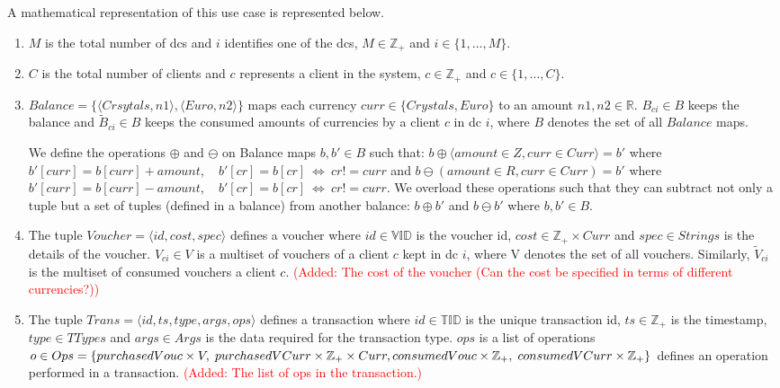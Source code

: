 A mathematical representation of this use case is represented below.
\begin{enumerate}
	\item $M$ is the total number of \glspl{dc} and $i$ identifies one of the \glspl{dc}, $M \in \mathbb{Z}_{+}$ and $i \in \{1,\dots, M\}$.

	\item $C$ is the total number of clients and $c$ represents a client in the system, $c \in \mathbb{Z}_{+}$ and $c \in \{1,\dots, C\}$.

	\item $Balance = \{ \langle Crsytals, n1 \rangle, \langle Euro, n2 \rangle \}$ maps each currency $curr \in \{Crystals, Euro\}$ to an amount $n1, n2 \in \mathbb{R}$. $B_{ci} \in B$ keeps the balance and $\widetilde{B}_{ci} \in B$ keeps the consumed amounts of currencies by a client $c$ in \gls{dc} $i$, where $B$ denotes the set of all $Balance$ maps.

	We define the operations $\oplus$ and $\ominus$ on Balance maps $b, b' \in B$ such that: $b \oplus \langle amount \in Z, curr \in Curr \rangle = b'$ where $b'[curr] = b[curr] + amount$,  ~  $b'[cr] = b[cr]  ~ \iff  ~  cr != curr$ and $b \ominus(amount \in R, curr \in Curr) = b'$ where $b'[curr] = b[curr] - amount$,  ~  $b'[cr] = b[cr]  ~  \iff  ~  cr != curr$. We overload these operations such that they can subtract not only a tuple but a set of tuples (defined in a balance) from another balance: $b \oplus b'$ and $b \ominus b'$ where $b, b' \in B$.  
	
	\item The tuple $Voucher = \langle id, cost, spec \rangle$ defines a voucher where $id \in \mathbb{VID}$  is the voucher \gls{id}, $cost \in \mathbb{Z}_{+} \times Curr$ and $spec \in Strings$ is the details of the voucher. $V_{ci} \in V$ is a multiset of vouchers of a client $c$ kept in \gls{dc} $i$, where V denotes the set of all vouchers. Similarly, $\widetilde{V}_{ci}$ is the multiset of consumed vouchers a client $c$.
	\textcolor{red}{(Added: The cost of the voucher (Can the cost be specified in terms of different currencies?))}
	
	\item The tuple $Trans = \langle id, ts, type, args, ops \rangle$ defines a transaction where $id \in \mathbb{TID}$ is the unique transaction \gls{id}, $ts \in \mathbb{Z}_{+}$ is the timestamp, $type \in TTypes$ and $args \in Args$ is the data required for the transaction type.  $ops$ is a list of operations $o \in Ops = \{ purchasedVouc \times V, \; purchasedVCurr \times \mathbb{Z}_{+} \times Curr, \\ consumedVouc \times \mathbb{Z}_{+}, \; consumedVCurr \times \mathbb{Z}_{+} \}$ defines an operation performed in a transaction. \textcolor{red}{(Added: The list of ops in the transaction.)}
 	

\end{enumerate}
